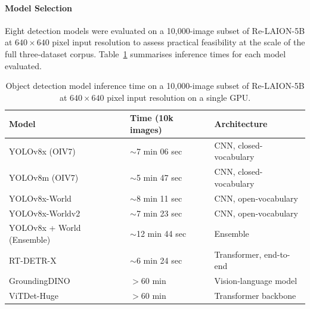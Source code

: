 \paragraph{Model Selection}
Eight detection models were evaluated on a 10{,}000-image subset of Re-LAION-5B 
at $640 \times 640$ pixel input resolution to assess practical feasibility at 
the scale of the full three-dataset corpus. Table~\ref{tab:objdet_speed} 
summarises inference times for each model evaluated.

\begin{table}[ht]
	\centering
	\caption{Object detection model inference time on a 10{,}000-image subset 
		of Re-LAION-5B at $640 \times 640$ pixel input resolution on a single GPU.}
	\label{tab:objdet_speed}
	\begin{tabular}{lll}
		\hline
		\textbf{Model} & \textbf{Time (10k images)} & \textbf{Architecture} \\
		\hline
		YOLOv8x (OIV7)              & $\sim$7 min 06 sec  & CNN, closed-vocabulary \\
		YOLOv8m (OIV7)              & $\sim$5 min 47 sec  & CNN, closed-vocabulary \\
		YOLOv8x-World               & $\sim$8 min 11 sec  & CNN, open-vocabulary \\
		YOLOv8x-Worldv2             & $\sim$7 min 23 sec  & CNN, open-vocabulary \\
		YOLOv8x + World (Ensemble)  & $\sim$12 min 44 sec & Ensemble \\
		RT-DETR-X                   & $\sim$6 min 24 sec  & Transformer, end-to-end \\
		GroundingDINO               & $>$60 min           & Vision-language model \\
		ViTDet-Huge                 & $>$60 min           & Transformer backbone \\
		\hline
	\end{tabular}
\end{table}

